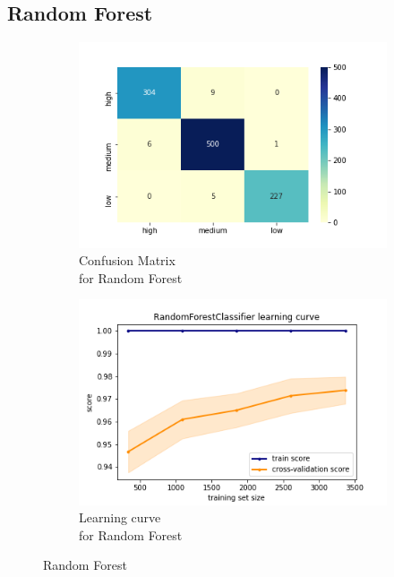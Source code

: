 \subsection{Random Forest}
\begin{figure}[h!]
     \captionsetup{justification=centering}             
     \centering
     \begin{subfigure}{0.49\textwidth}
         \centering
         \captionsetup{type=figure}
         \includegraphics[scale=0.45]{img/classification/rf_confusion.png}
         \caption{Confusion Matrix \\ for Random Forest}
         \label{fig:rf_confusion}
     \end{subfigure}
     \begin{subfigure}{0.49\textwidth}
         \centering
         \includegraphics[scale=0.45]{img/classification/rf_lc.png}
         \caption{Learning curve \\ for Random Forest}
         \label{fig:rf_lc}
     \end{subfigure}
     \caption{Random Forest}
    \label{fig:rf}
\end{figure}

